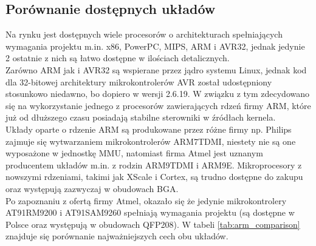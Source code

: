 \documentclass[a4paper,12pt]{book}
\begin{document}
			\subsection{Porównanie dostępnych układów}
				Na rynku jest dostępnych wiele procesorów o architekturach spełniających wymagania projektu m.in. x86, PowerPC, MIPS, ARM i AVR32, jednak jedynie 2 ostatnie z nich są łatwo dostępne w ilościach detalicznych.\\
				Zarówno ARM jak i AVR32 są wspierane przez jądro systemu Linux, jednak kod dla 32-bitowej architektury mikrokontrolerów AVR został udostępniony stosunkowo niedawno, bo dopiero w wersji 2.6.19. W związku z tym zdecydowano się na wykorzystanie jednego z procesorów zawierających rdzeń firmy ARM\cite{website:arm}, które już od dłuższego czasu posiadają stabilne sterowniki w źródłach kernela.\\
				Układy oparte o rdzenie ARM są produkowane przez różne firmy np. Philips zajmuje się wytwarzaniem mikrokontrolerów ARM7TDMI, niestety nie są one wyposażone w jednostkę MMU, natomiast firma Atmel jest uznanym producentem układów m.in. z rodzin ARM9TDMI i ARM9E. Mikroprocesory z nowszymi rdzeniami, takimi jak XScale i Cortex, są trudno dostępne do zakupu oraz występują zazwyczaj w obudowach BGA.\\
				Po zapoznaniu z ofertą firmy Atmel, okazało się że jedynie mikrokontrolery AT91RM9200 i AT91SAM9260 spełniają wymagania projektu (są dostępne w Polsce oraz występują w obudowach QFP208). W tabeli \ref{tab:arm_comparison} znajduje się porównanie najważniejszych cech obu układów.
				
\end{document}
